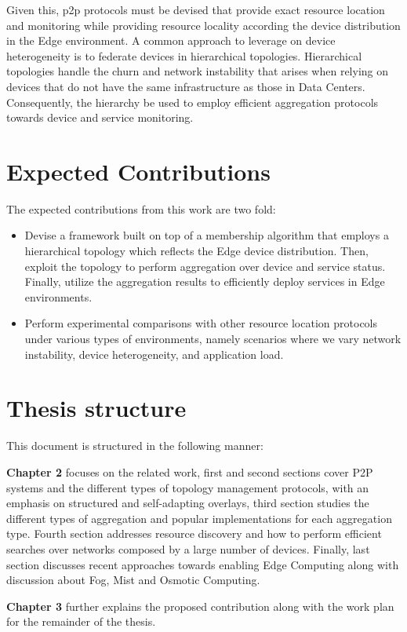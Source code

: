 Given this, p2p protocols must be devised that provide exact resource location and monitoring while providing resource locality according the device distribution in the Edge environment. A common approach to leverage on device heterogeneity is to federate devices in hierarchical topologies. Hierarchical topologies handle the churn and network instability that arises when relying on devices that do not have the same infrastructure as those in Data Centers. Consequently, the hierarchy be used to employ efficient aggregation protocols towards device and service monitoring.

\section{Expected Contributions}

The expected contributions from this work are two fold:

\begin{itemize}
    \item Devise a framework built on top of a membership algorithm that employs a hierarchical topology which reflects the Edge device distribution. Then, exploit the topology to perform aggregation over device and service status. Finally, utilize the aggregation results to efficiently deploy services in Edge environments.

    \item Perform experimental comparisons with other resource location protocols under various types of environments, namely scenarios where we vary network instability, device heterogeneity, and application load. 
\end{itemize}

\section{Thesis structure}

This document is structured in the following manner:

\textbf{Chapter 2} focuses on the related work, first and second sections cover P2P systems and the different types of topology management protocols, with an emphasis on structured and self-adapting overlays, third section studies the different types of aggregation and popular implementations for each aggregation type. Fourth section addresses resource discovery and how to perform efficient searches over networks composed by a large number of devices. Finally, last section discusses recent approaches towards enabling Edge Computing along with discussion about Fog, Mist and Osmotic Computing.

\textbf{Chapter 3} further explains the proposed contribution along with the work plan for the remainder of the thesis. 

